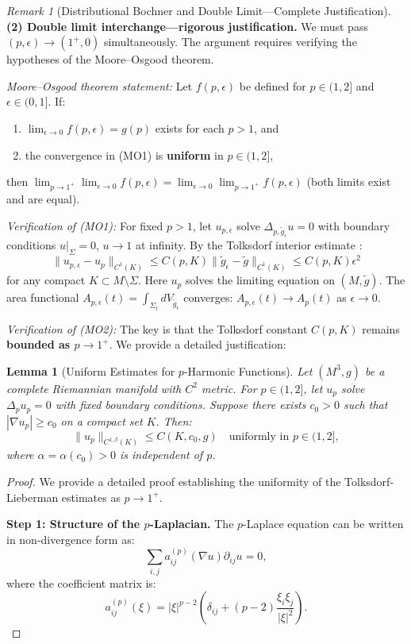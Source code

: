 \documentclass[12pt]{article}
\theoremstyle{plain}
\newtheorem{lemma}[theorem]{Lemma}
\theoremstyle{definition}
\theoremstyle{remark}
\newtheorem{remark}[theorem]{Remark}
\newcommand{\tg}{\tilde{g}}
\begin{document}
\begin{remark}[Distributional Bochner and Double Limit---Complete Justification]
\textbf{(2) Double limit interchange---rigorous justification.} We must pass $(p, \epsilon) \to (1^+, 0)$ simultaneously. The argument requires verifying the hypotheses of the Moore--Osgood theorem.

\textit{Moore--Osgood theorem statement:} Let $f(p, \epsilon)$ be defined for $p \in (1, 2]$ and $\epsilon \in (0, 1]$. If:
\begin{enumerate}
    \item[(MO1)] $\lim_{\epsilon \to 0} f(p, \epsilon) = g(p)$ exists for each $p > 1$, and
    \item[(MO2)] the convergence in (MO1) is \textbf{uniform} in $p \in (1, 2]$,
\end{enumerate}
then $\lim_{p \to 1^+} \lim_{\epsilon \to 0} f(p, \epsilon) = \lim_{\epsilon \to 0} \lim_{p \to 1^+} f(p, \epsilon)$ (both limits exist and are equal).

\textit{Verification of (MO1):} For fixed $p > 1$, let $u_{p,\epsilon}$ solve $\Delta_{p,\tg_\epsilon} u = 0$ with boundary conditions $u|_\Sigma = 0$, $u \to 1$ at infinity. By the Tolksdorf interior estimate \cite{tolksdorf1984}:
\[
\|u_{p,\epsilon} - u_p\|_{C^1(K)} \leq C(p, K) \|\tg_\epsilon - \tg\|_{C^1(K)} \leq C(p, K) \epsilon^2
\]
for any compact $K \subset M \setminus \Sigma$. Here $u_p$ solves the limiting equation on $(M, \tg)$. The area functional $A_{p,\epsilon}(t) = \int_{\Sigma_t} dV_{\tg_\epsilon}$ converges: $A_{p,\epsilon}(t) \to A_p(t)$ as $\epsilon \to 0$.

\textit{Verification of (MO2):} The key is that the Tolksdorf constant $C(p, K)$ remains \textbf{bounded as $p \to 1^+$}. We provide a detailed justification:

\begin{lemma}[Uniform Estimates for $p$-Harmonic Functions]\label{lem:uniform-p-estimates}
Let $(M^3, g)$ be a complete Riemannian manifold with $C^2$ metric. For $p \in (1, 2]$, let $u_p$ solve $\Delta_p u_p = 0$ with fixed boundary conditions. Suppose there exists $c_0 > 0$ such that $|\nabla u_p| \geq c_0$ on a compact set $K$. Then:
\[
\|u_p\|_{C^{1,\beta}(K)} \leq C(K, c_0, g) \quad \text{uniformly in } p \in (1, 2],
\]
where $\alpha = \alpha(c_0) > 0$ is independent of $p$.
\end{lemma}

\begin{proof}
We provide a detailed proof establishing the uniformity of the Tolksdorf-Lieberman estimates as $p \to 1^+$.

\textbf{Step 1: Structure of the $p$-Laplacian.} The $p$-Laplace equation can be written in non-divergence form as:
\[
\sum_{i,j} a_{ij}^{(p)}(\nabla u) \partial_{ij} u = 0,
\]
where the coefficient matrix is:
\[
a_{ij}^{(p)}(\xi) = |\xi|^{p-2}\left(\delta_{ij} + (p-2)\frac{\xi_i\xi_j}{|\xi|^2}\right).
\]


\end{proof}
\end{remark}
\end{document}
